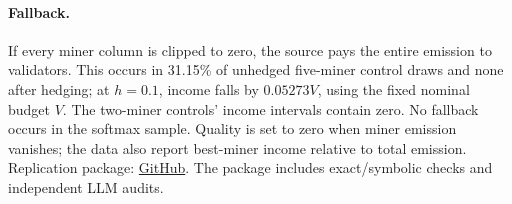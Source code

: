 \documentclass[sigconf,anonymous,review]{acmart}
\numberwithin{equation}{section}
\begin{document}
\paragraph{Fallback.} If every miner column is clipped to zero, the source
pays the entire emission to validators. This occurs in 31.15\% of
unhedged five-miner control draws and none after hedging; at $h=0.1$,
income falls by $0.05273V$, using the fixed nominal budget $V$.
The two-miner controls' income intervals contain zero.
No fallback occurs in the softmax sample. Quality is set to zero when
miner emission vanishes; the data also report best-miner income
relative to total emission.
Replication package: \href{https://github.com/submissionrepo/bittensor-yuma-replication}{GitHub}.
The package includes exact/symbolic checks and independent LLM audits.
\end{document}
